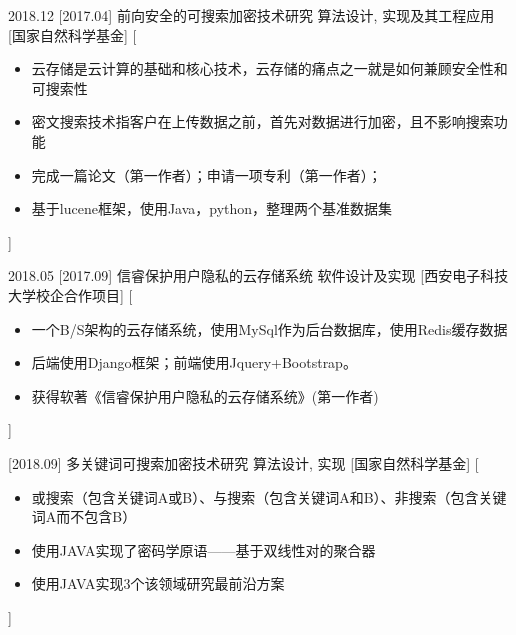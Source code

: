 \documentclass[zh]{resume}
\begin{document}
\begin{experiences}
  \experience
    {2018.12}%
    [2017.04]%
    {前向安全的可搜索加密技术研究}%
    {算法设计, 实现及其工程应用}%
    [国家自然科学基金]%
    [\begin{itemize}
      \item{\icon{\faFlag}} 云存储是云计算的基础和核心技术，云存储的痛点之一就是如何兼顾安全性和可搜索性
      \item{\icon{\faFlag}} 密文搜索技术指客户在上传数据之前，首先对数据进行加密，且不影响搜索功能
      \item{\icon{\faCheck}} 完成一篇论文（第一作者）；申请一项专利（第一作者）；
      \item{\icon{\faCheck}} 基于lucene框架，使用Java，python，整理两个基准数据集  %
    \end{itemize}]%

  \separator{0.2em}
  \experience
    {2018.05}%
    [2017.09]%
    {信睿保护用户隐私的云存储系统}%
    {软件设计及实现}%
    [西安电子科技大学校企合作项目]%
    [\begin{itemize}
      \item{\icon{\faFlag}} 一个B/S架构的云存储系统，使用MySql作为后台数据库，使用Redis缓存数据
      \item{\icon{\faFlag}} 后端使用Django框架；前端使用Jquery+Bootstrap。
      \item{\icon{\faCheck}} 获得软著《信睿保护用户隐私的云存储系统》(第一作者)
    \end{itemize}]%

  \separator{0.2em}
  \experience
    {}
    [2018.09]%
    {多关键词可搜索加密技术研究}%
    {算法设计, 实现}%
    [国家自然科学基金]%
    [\begin{itemize}
      \item{\icon{\faFlag}} 或搜索（包含关键词A或B）、与搜索（包含关键词A和B）、非搜索（包含关键词A而不包含B）
      \item{\icon{\faCheck}} 使用JAVA实现了密码学原语——基于双线性对的聚合器 
      \item{\icon{\faCheck}} 使用JAVA实现3个该领域研究最前沿方案     
    \end{itemize}]%



\end{experiences}
\end{document}
